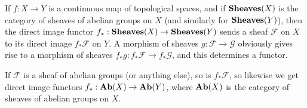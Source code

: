 \documentclass[12pt]{article}
\begin{document}
If $f : X\to Y$ is a continuous map of topological spaces, and if ${\bf Sheaves}(X)$ is the category of sheaves of abelian groups on $X$ (and similarly for ${\bf Sheaves}(Y)$), then the direct image functor $f_* : {\bf Sheaves}(X)\to {\bf Sheaves}(Y)$ sends a sheaf $\mathcal{F}$ on $X$ to its direct image $f_*\mathcal{F}$ on $Y$.  A morphism of sheaves $g : \mathcal{F}\to\mathcal{G}$ obviously gives rise to a morphism of sheaves $f_* g : f_*\mathcal{F}\to f_*\mathcal{G}$, and this determines a functor.

If $\mathcal{F}$ is a sheaf of abelian groups (or anything else), so is $f_*\mathcal{F}$, so likewise we get direct image functors $f_* : {\bf Ab}(X)\to {\bf Ab}(Y)$, where ${\bf Ab}(X)$ is the category of sheaves of abelian groups on $X$.
\end{document}
